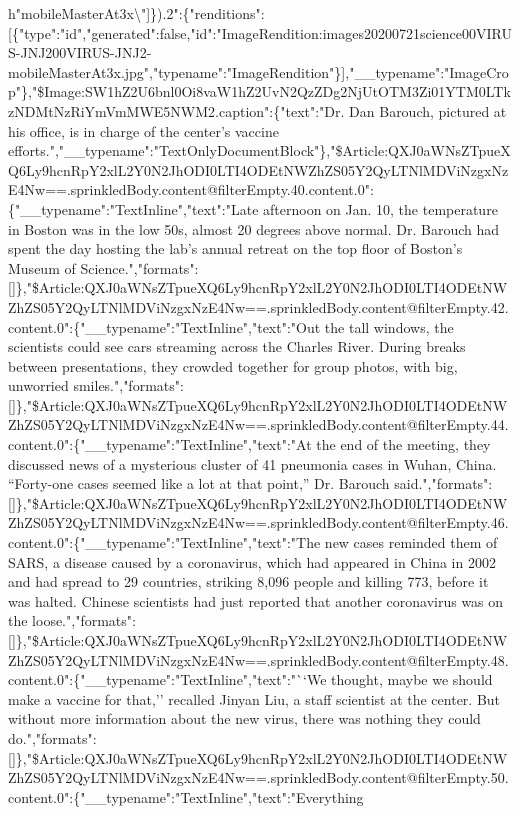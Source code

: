 h{}"mobileMasterAt3x\textbackslash{}"{]}\}).2":\{"renditions":{[}\{"type":"id","generated":false,"id":"ImageRendition:images20200721science00VIRUS-JNJ200VIRUS-JNJ2-mobileMasterAt3x.jpg","typename":"ImageRendition"\}{]},"\_\_typename":"ImageCrop"\},"\$Image:SW1hZ2U6bnl0Oi8vaW1hZ2UvN2QzZDg2NjUtOTM3Zi01YTM0LTkzNDMtNzRiYmVmMWE5NWM2.caption":\{"text":"Dr.
Dan Barouch, pictured at his office, is in charge of the center's
vaccine
efforts.","\_\_typename":"TextOnlyDocumentBlock"\},"\$Article:QXJ0aWNsZTpueXQ6Ly9hcnRpY2xlL2Y0N2JhODI0LTI4ODEtNWZhZS05Y2QyLTNlMDViNzgxNzE4Nw==.sprinkledBody.content@filterEmpty.40.content.0":\{"\_\_typename":"TextInline","text":"Late
afternoon on Jan. 10, the temperature in Boston was in the low 50s,
almost 20 degrees above normal. Dr. Barouch had spent the day hosting
the lab's annual retreat on the top floor of Boston's Museum of
Science.","formats":{[}{]}\},"\$Article:QXJ0aWNsZTpueXQ6Ly9hcnRpY2xlL2Y0N2JhODI0LTI4ODEtNWZhZS05Y2QyLTNlMDViNzgxNzE4Nw==.sprinkledBody.content@filterEmpty.42.content.0":\{"\_\_typename":"TextInline","text":"Out
the tall windows, the scientists could see cars streaming across the
Charles River. During breaks between presentations, they crowded
together for group photos, with big, unworried
smiles.","formats":{[}{]}\},"\$Article:QXJ0aWNsZTpueXQ6Ly9hcnRpY2xlL2Y0N2JhODI0LTI4ODEtNWZhZS05Y2QyLTNlMDViNzgxNzE4Nw==.sprinkledBody.content@filterEmpty.44.content.0":\{"\_\_typename":"TextInline","text":"At
the end of the meeting, they discussed news of a mysterious cluster of
41 pneumonia cases in Wuhan, China. ``Forty-one cases seemed like a lot
at that point,'' Dr. Barouch
said.","formats":{[}{]}\},"\$Article:QXJ0aWNsZTpueXQ6Ly9hcnRpY2xlL2Y0N2JhODI0LTI4ODEtNWZhZS05Y2QyLTNlMDViNzgxNzE4Nw==.sprinkledBody.content@filterEmpty.46.content.0":\{"\_\_typename":"TextInline","text":"The
new cases reminded them of SARS, a disease caused by a coronavirus,
which had appeared in China in 2002 and had spread to 29 countries,
striking 8,096 people and killing 773, before it was halted. Chinese
scientists had just reported that another coronavirus was on the
loose.","formats":{[}{]}\},"\$Article:QXJ0aWNsZTpueXQ6Ly9hcnRpY2xlL2Y0N2JhODI0LTI4ODEtNWZhZS05Y2QyLTNlMDViNzgxNzE4Nw==.sprinkledBody.content@filterEmpty.48.content.0":\{"\_\_typename":"TextInline","text":"``We
thought, maybe we should make a vaccine for that,'' recalled Jinyan Liu,
a staff scientist at the center. But without more information about the
new virus, there was nothing they could
do.","formats":{[}{]}\},"\$Article:QXJ0aWNsZTpueXQ6Ly9hcnRpY2xlL2Y0N2JhODI0LTI4ODEtNWZhZS05Y2QyLTNlMDViNzgxNzE4Nw==.sprinkledBody.content@filterEmpty.50.content.0":\{"\_\_typename":"TextInline","text":"Everything
